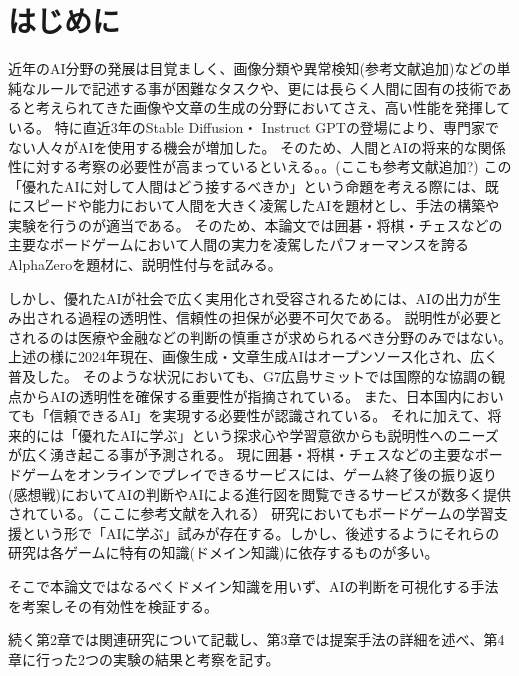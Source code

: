 \chapter{はじめに}
近年のAI分野の発展は目覚ましく、画像分類や異常検知(参考文献追加)などの単純なルールで記述する事が困難なタスクや、更には長らく人間に固有の技術であると考えられてきた画像や文章の生成の分野においてさえ、高い性能を発揮している。
特に直近3年のStable Diffusion\cite{diffusion}・ Instruct GPT\cite{GPT}の登場により、専門家でない人々がAIを使用する機会が増加した。
そのため、人間とAIの将来的な関係性に対する考察の必要性が高まっているといえる。。(ここも参考文献追加?)
この「優れたAIに対して人間はどう接するべきか」という命題を考える際には、既にスピードや能力において人間を大きく凌駕したAIを題材とし、手法の構築や実験を行うのが適当である。
そのため、本論文では囲碁・将棋・チェスなどの主要なボードゲームにおいて人間の実力を凌駕したパフォーマンスを誇るAlphaZero\cite{AlphaZero}を題材に、説明性付与を試みる。

しかし、優れたAIが社会で広く実用化され受容されるためには、AIの出力が生み出される過程の透明性、信頼性の担保が必要不可欠である。
説明性が必要とされるのは医療や金融などの判断の慎重さが求められるべき分野のみではない。上述の様に2024年現在、画像生成・文章生成AIはオープンソース化され、広く普及した。
そのような状況においても、G7広島サミットでは国際的な協調の観点からAIの透明性を確保する重要性が指摘されている\cite{Hiroshima}。
また、日本国内においても「信頼できるAI」を実現する必要性が認識されている\cite{グランドデザイン}。
それに加えて、将来的には「優れたAIに学ぶ」という探求心や学習意欲からも説明性へのニーズが広く湧き起こる事が予測される。
現に囲碁・将棋・チェスなどの主要なボードゲームをオンラインでプレイできるサービスには、ゲーム終了後の振り返り(感想戦)においてAIの判断やAIによる進行図を閲覧できるサービスが数多く提供されている。（ここに参考文献を入れる）
研究においてもボードゲームの学習支援という形で「AIに学ぶ」試みが存在する。しかし、後述するようにそれらの研究は各ゲームに特有の知識(ドメイン知識)に依存するものが多い。

そこで本論文ではなるべくドメイン知識を用いず、AIの判断を可視化する手法を考案しその有効性を検証する。

続く第2章では関連研究について記載し、第3章では提案手法の詳細を述べ、第4章に行った2つの実験の結果と考察を記す。

